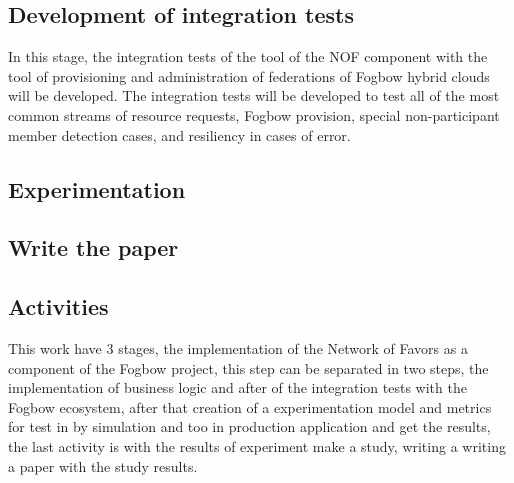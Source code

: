 \documentclass{article}
\begin{document}
\subsection{Development of integration tests}
    In this stage, the integration tests of the tool of the NOF component with the tool of provisioning and administration of federations of Fogbow hybrid clouds will be developed. The integration tests will be developed to test all of the most common streams of resource requests, Fogbow provision, special non-participant member detection cases, and resiliency in cases of error.
\subsection{Experimentation}
\subsection{Write the paper}

\subsection{Activities}
This work have 3 stages, the implementation of the Network of Favors as a component of the Fogbow project, this step can be separated in two steps, the implementation of business logic and after of the integration tests with the Fogbow ecosystem, after that creation of a experimentation model and metrics for test in by simulation and too in production application and get the results, the last activity is with the results of experiment make a study, writing a writing a paper with the study results.
\end{document}
